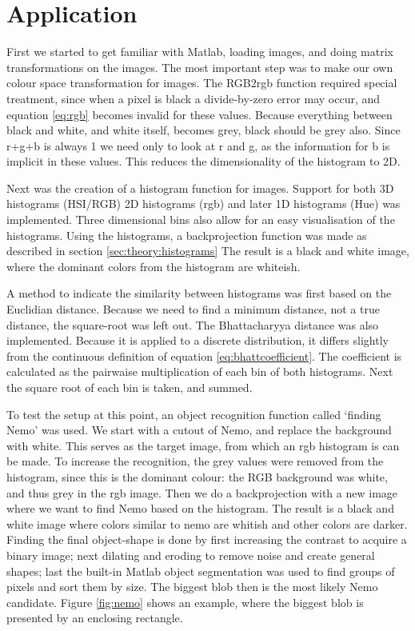 \documentclass[a4paper,11pt]{article}
\begin{document}
\section{Application}
\label{sec:application}
First we started to get familiar with Matlab, loading images, and doing matrix transformations on the images.
The most important step was to make our own colour space transformation for images.
The RGB2rgb function required special treatment, since when a pixel is black a divide-by-zero error may occur, and equation \ref{eq:rgb} becomes invalid for these values.
Because everything between black and white, and white itself, becomes grey, black should be grey also.
Since r+g+b is always 1 we need only to look at r and g, as the information for b is implicit in these values.
This reduces the dimensionality of the histogram to 2D.

Next was the creation of a histogram function for images.
Support for both 3D histograms (HSI/RGB) 2D histograms (rgb) and later 1D histograms (Hue) was implemented.
Three dimensional bins also allow for an easy visualisation of the histograms.
Using the histograms, a backprojection function was made as described in section \ref{sec:theory:histograms}
The result is a black and white image, where the dominant colors from the histogram are whiteish.

A method to indicate the similarity between histograms was first based on the Euclidian distance. Because we need to find a minimum distance, not a true distance, the square-root was left out.
The Bhattacharyya distance was also implemented.
Because it is applied to a discrete distribution, it differs slightly from the continuous definition of equation \ref{eq:bhattcoefficient}.
The coefficient is calculated as the pairwaise multiplication of each bin of both histograms.
Next the square root of each bin is taken, and summed.

To test the setup at this point, an object recognition function called `finding Nemo' was used.
We start with a cutout of Nemo, and replace the background with white.
This serves as the target image, from which an rgb histogram is can be made.
To increase the recognition, the grey values were removed from the histogram, since this is the dominant colour: the RGB background was white, and thus grey in the rgb image.
Then we do a backprojection with a new image where we want to find Nemo based on the histogram.
The result is a black and white image where colors similar to nemo are whitish and other colors are darker.
Finding the final object-shape is done by first increasing the contrast to acquire a binary image; next dilating and eroding to remove noise and create general shapes; last the built-in Matlab object segmentation was used to find groups of pixels and sort them by size.
The biggest blob then is the most likely Nemo candidate.
Figure \ref{fig:nemo} shows an example, where the biggest blob is presented by an enclosing rectangle.
\end{document}
